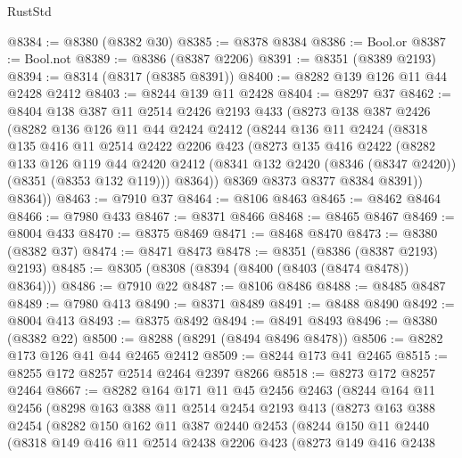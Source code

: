 \begin{lexlean}{RustStd}
\begin{coremodule}
{\begin{coremodule}
{{{{{{{{{{{{{{{{{{{{{{{{{{{{{{{{{{{{{{{{{{{{{{{{{{@8384 := @8380 (@8382 @30)
@8385 := @8378 @8384
@8386 := Bool.or
@8387 := Bool.not
@8389 := @8386 (@8387 @2206)
@8391 := @8351 (@8389 @2193)
@8394 := @8314 (@8317 (@8385 @8391))
@8400 := @8282 @139 @126 @11 @44 @2428 @2412
@8403 := @8244 @139 @11 @2428
@8404 := @8297 @37
@8462 := @8404
    @138
    @387
    @11
    @2514
    @2426
    @2193
    @433
    (@8273
      @138
      @387
      @2426
      (@8282
        @136
        @126
        @11
        @44
        @2424
        @2412
        (@8244
          @136
          @11
          @2424
          (@8318
            @135
            @416
            @11
            @2514
            @2422
            @2206
            @423
            (@8273
              @135
              @416
              @2422
              (@8282
                @133
                @126
                @119
                @44
                @2420
                @2412
                (@8341 @132 @2420 (@8346 (@8347 @2420)) (@8351 (@8353 @132 @119)))
                @8364))
            @8369
            @8373
            @8377
            @8384
            @8391))
        @8364))
@8463 := @7910 @37
@8464 := @8106 @8463
@8465 := @8462 @8464
@8466 := @7980 @433
@8467 := @8371 @8466
@8468 := @8465 @8467
@8469 := @8004 @433
@8470 := @8375 @8469
@8471 := @8468 @8470
@8473 := @8380 (@8382 @37)
@8474 := @8471 @8473
@8478 := @8351 (@8386 (@8387 @2193) @2193)
@8485 := @8305 (@8308 (@8394 (@8400 (@8403 (@8474 @8478)) @8364)))
@8486 := @7910 @22
@8487 := @8106 @8486
@8488 := @8485 @8487
@8489 := @7980 @413
@8490 := @8371 @8489
@8491 := @8488 @8490
@8492 := @8004 @413
@8493 := @8375 @8492
@8494 := @8491 @8493
@8496 := @8380 (@8382 @22)
@8500 := @8288 (@8291 (@8494 @8496 @8478))
@8506 := @8282 @173 @126 @41 @44 @2465 @2412
@8509 := @8244 @173 @41 @2465
@8515 := @8255 @172 @8257 @2514 @2464 @2397 @8266
@8518 := @8273 @172 @8257 @2464
@8667 := @8282
    @164
    @171
    @11
    @45
    @2456
    @2463
    (@8244
      @164
      @11
      @2456
      (@8298
        @163
        @388
        @11
        @2514
        @2454
        @2193
        @413
        (@8273
          @163
          @388
          @2454
          (@8282
            @150
            @162
            @11
            @387
            @2440
            @2453
            (@8244
              @150
              @11
              @2440
              (@8318
                @149
                @416
                @11
                @2514
                @2438
                @2206
                @423
                (@8273
                  @149
                  @416
                  @2438
}}}}}}}}}}}}}}}}}}}}}}}}}}}}}}}}}}}}}}}}}}}}}}}}}}
\end{coremodule}}
\end{coremodule}
\end{lexlean}
